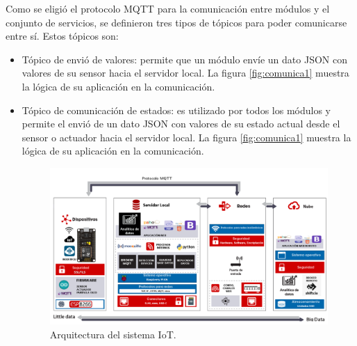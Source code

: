 Como se eligió el protocolo MQTT para la comunicación entre módulos y el conjunto de servicios, se definieron tres tipos de tópicos para poder comunicarse entre sí. Estos tópicos son:

\begin{itemize}

\item Tópico de envió de valores: permite que un módulo envíe un dato JSON con valores de su sensor hacia el servidor local.  La figura \ref{fig:comunica1} muestra la lógica de su aplicación en la comunicación.

\item Tópico de comunicación de estados: es utilizado por todos los módulos y permite el envió de un dato JSON con valores de su estado actual desde el sensor o actuador hacia el servidor local. La figura \ref{fig:comunica1} muestra la lógica de su aplicación en la comunicación.

\begin{landscape} %
\begin{figure}[htpb]
\centering 
\includegraphics[width=1.65\textwidth]{./Figures/arquitectura-listo.png}
\caption{Arquitectura del sistema IoT.}
\label{fig:arquitectura}
\end{figure}
\end{landscape} %


\end{itemize}
